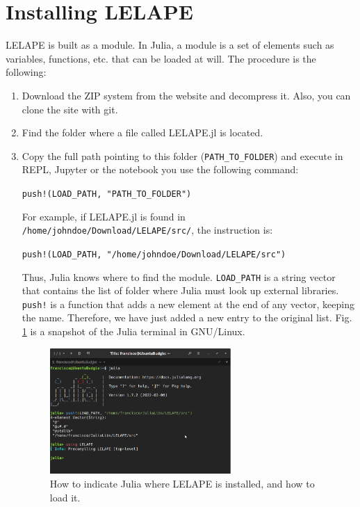 \section{Installing LELAPE}
LELAPE is built as a module. In Julia, a module is a set of elements such as variables, functions, etc. that can be loaded at will. The procedure is the following:
%
\begin{enumerate}
	\item Download the ZIP system from the website and decompress it. Also, you can clone the site with git.
	\item Find the folder where a file called LELAPE.jl is located.
	\item Copy the full path pointing to this folder (\texttt{PATH\_TO\_FOLDER}) and execute in REPL, Jupyter or the notebook you use the following command:
	
	\vspace{1mm}
	\begin{center}
		\texttt{push!(LOAD\_PATH, "PATH\_TO\_FOLDER")}
	\end{center}
	\vspace{1mm}	
	
	For example, if LELAPE.jl is found in \texttt{/home/johndoe/Download/LELAPE/src/}, the instruction is:
		
	\vspace{1mm}
	\begin{center}
		\texttt{push!(LOAD\_PATH, "/home/johndoe/Download/LELAPE/src")}
	\end{center}
	\vspace{1mm}	
	
	Thus, Julia knows where to find the module. \texttt{LOAD\_PATH} is a string vector that contains the list of folder where Julia must look up external libraries. \texttt{push!} is a function that adds a new element at the end of any vector, keeping the name. Therefore, we have just added a new entry to the original list.	Fig. \ref{Fig:Loading_LELAPE} is a snapshot of the Julia terminal in GNU/Linux.
	\begin{figure}
		\centering
		
		\includegraphics[width=0.65\textwidth]{fig/Loading_LELAP.png}
		\caption{How to indicate Julia where LELAPE is installed, and how to load it.}
		\label{Fig:Loading_LELAPE}
	\end{figure}
	

\end{enumerate}
